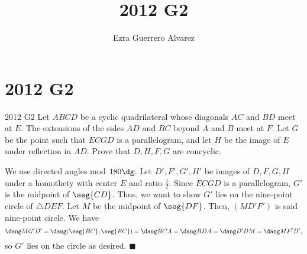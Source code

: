 \documentclass[14pt]{article}
\title{2012 G2}
\author{Ezra Guerrero Alvarez}
\begin{document}
\maketitle
	
\section*{2012 G2}

\begin{statement}{2012 G2}
	Let $ABCD$ be a cyclic quadrilateral whose diagonals $AC$ and $BD$ meet at $E$. The extensions of the sides $AD$ and $BC$ beyond $A$ and $B$ meet at $F$. Let $G$ be the point such that $ECGD$ is a parallelogram, and let $H$ be the image of $E$ under reflection in $AD$. Prove that $D,H,F,G$ are concyclic.
\end{statement}
We use directed angles mod $180\dg$. Let $D',F',G',H'$ be images of $D,F,G,H$ under a homothety with center $E$ and ratio $\frac12$. Since $ECGD$ is a parallelogram, $G'$ is the midpoint of $\seg{CD}$. Thus, we want to show $G'$ lies on the nine-point circle of $\triangle DEF$. Let $M$ be the midpoint of $\seg{DF}$. Then, $(MD'F')$ is said nine-point circle. We have
\[ \dang MG'D' = \dang(\seg{BC},\seg{EC}) = \dang BCA = \dang BDA = \dang D'DM = \dang MF'D',  \]
so $G'$ lies on the circle as desired. $\blacksquare$
	
\end{document}
